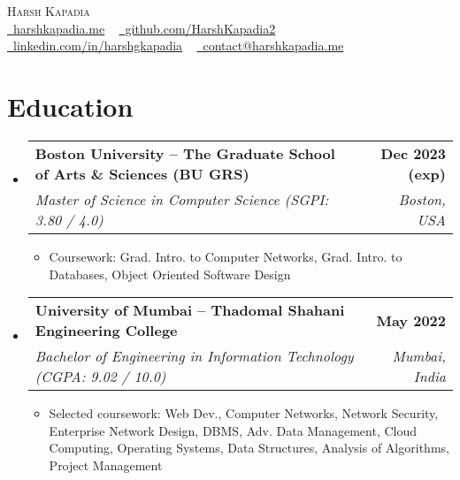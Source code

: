 \documentclass[letterpaper,11pt]{article}
\makeatletter
\newcommand{\resumeItem}[1]{
  \item\small{
    {#1 \vspace{-2pt}}
  }
}
\newcommand{\resumeSubheading}[4]{
  \vspace{-2pt}\item
    \begin{tabular*}{1.0\textwidth}[t]{l@{\extracolsep{\fill}}r}
      \vspace{-2pt}\textbf{#1} & \textbf{\small #2} \\
      \textit{\small#3} & \textit{\small #4} \\
    \end{tabular*}\vspace{-7pt}
}
\newcommand{\resumeSubHeadingListStart}{\begin{itemize}[leftmargin=0.0in, label={}]}
\newcommand{\resumeSubHeadingListEnd}{\end{itemize}}
\newcommand{\resumeItemListStart}{\begin{itemize}}
\newcommand{\resumeItemListEnd}{\end{itemize}\vspace{-5pt}}
\makeatother
\begin{document}

\begin{center}
    {\huge \scshape Harsh Kapadia} \\ \vspace{1pt}
    \small
    \faGlobe \href{https://harshkapadia.me}{\raisebox{-0.1\height}\ harshkapadia.me} ~
    \faGithub \href{https://github.com/HarshKapadia2}{\raisebox{-0.2\height}\ github.com/HarshKapadia2} ~
    \faLinkedin \href{https://linkedin.com/in/harshgkapadia}{\raisebox{-0.2\height}\ linkedin.com/in/harshgkapadia} ~
    \faEnvelope \href{mailto:contact@harshkapadia.me}{\raisebox{-0.2\height}\  contact@harshkapadia.me}
    \vspace{-13pt}
\end{center}


\section{Education}
    \vspace{-2pt}
    \resumeSubHeadingListStart
        \resumeSubheading
            {Boston University -- The Graduate School of Arts \& Sciences (BU GRS)}{Dec 2023 (exp)}
            {Master of Science in Computer Science (SGPI: 3.80 / 4.0)}{Boston, USA}
            \resumeItemListStart
                \resumeItem{Coursework: Grad. Intro. to Computer Networks, Grad. Intro. to Databases, Object Oriented Software Design}
            \resumeItemListEnd
        \vspace{-3pt}

        \resumeSubheading
            {University of Mumbai -- Thadomal Shahani Engineering College}{May 2022}
            {Bachelor of Engineering in Information Technology (CGPA: 9.02 / 10.0)}{Mumbai, India}
            \resumeItemListStart
                \resumeItem{Selected coursework: Web Dev., Computer Networks, Network Security, Enterprise Network Design, DBMS, Adv. Data Management, Cloud Computing, Operating Systems, Data Structures, Analysis of Algorithms, Project Management}
            \resumeItemListEnd
    \resumeSubHeadingListEnd
\vspace{-19pt}
\end{document}
